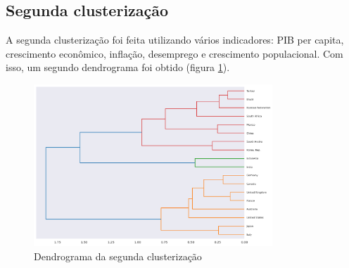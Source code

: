 \documentclass[a4paper, 11pt]{article}
\begin{document}
\subsection{Segunda clusterização}

A segunda clusterização foi feita utilizando vários indicadores: PIB per capita, crescimento econômico, inflação, desemprego e crescimento populacional.
Com isso, um segundo dendrograma foi obtido (figura \ref{fig:cluster-2-dendrogram}).

\begin{figure}[H]
    \centering
    \includegraphics[width=0.8\textwidth]{../images/dendrogram-economy-2.png}
    \caption{Dendrograma da segunda clusterização}
    \label{fig:cluster-2-dendrogram}
\end{figure}

\nocite{*}
\printbibliography
\end{document}
